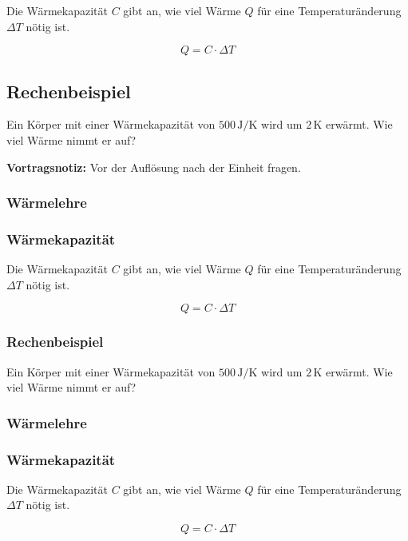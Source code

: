 Die Wärmekapazität $C$ gibt an, wie viel Wärme $Q$ für eine Temperaturänderung
$\Delta T$ nötig ist.

\[
Q = C \cdot \Delta T
\]

\subsection{Rechenbeispiel}

Ein Körper mit einer Wärmekapazität von $500\,\mathrm{J/K}$ wird um
$2\,\mathrm{K}$ erwärmt. Wie viel Wärme nimmt er auf?



\par\noindent\textbf{Vortragsnotiz:} Vor der Auflösung nach der Einheit fragen.\par

\begin{frame}[t]
\frametitle{Wärmelehre}

\end{frame}

\begin{frame}[t]
\frametitle{Wärmekapazität}

Die Wärmekapazität $C$ gibt an, wie viel Wärme $Q$ für eine Temperaturänderung
$\Delta T$ nötig ist.

\[
Q = C \cdot \Delta T
\]

\end{frame}

\begin{frame}[t]
\frametitle{Rechenbeispiel}

Ein Körper mit einer Wärmekapazität von $500\,\mathrm{J/K}$ wird um
$2\,\mathrm{K}$ erwärmt. Wie viel Wärme nimmt er auf?



\end{frame}

\begin{frame}[t]
\frametitle{Wärmelehre}

\end{frame}

\begin{frame}[t]
\frametitle{Wärmekapazität}

Die Wärmekapazität $C$ gibt an, wie viel Wärme $Q$ für eine Temperaturänderung
$\Delta T$ nötig ist.

\[
Q = C \cdot \Delta T
\]

\end{frame}

